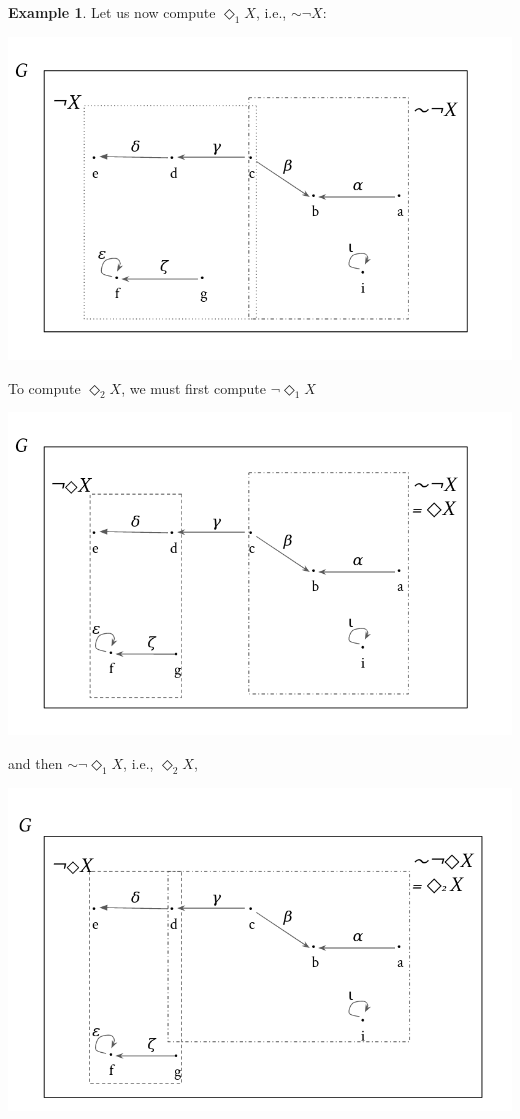 \documentclass[a4paper]{book}
\theoremstyle{definition}
\newtheorem{example}{Example}[section]
\theoremstyle{definition}
\theoremstyle{definition}
\theoremstyle{theorem}
\theoremstyle{definition}
\begin{document}
\begin{example}
	\par    
	Let us now compute $\Diamond_1 X$, i.e., $\sim \neg X$:
	\begin{center}
		\includegraphics*[scale=0.24]{GraphSubgraphNegation4.png}
	\end{center}  
	To compute $\Diamond_2 X$, we must first compute $ \neg \Diamond_1 X$
	\begin{center}
		\includegraphics*[scale=0.24]{GraphSubgraphNegation5.png}
	\end{center}  
	and then $\sim \neg \Diamond_1 X$, i.e., $\Diamond_2 X$, 
	\begin{center}
		\includegraphics*[scale=0.24]{GraphSubgraphNegation6.png}

\end{center}
\end{example}
\end{document}

